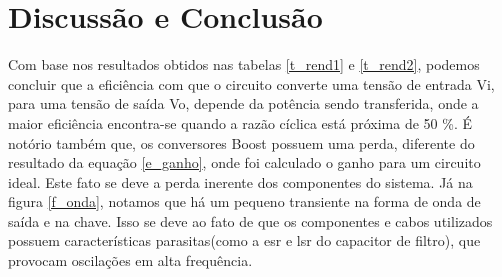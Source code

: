 \newpage
\section{Discussão e Conclusão}
Com base nos resultados obtidos nas tabelas \ref{t_rend1} e \ref{t_rend2}, podemos concluir que a eficiência com que o circuito converte uma tensão de entrada Vi, para uma tensão de saída Vo, depende da potência sendo transferida, onde a maior eficiência encontra-se quando a razão cíclica está próxima de 50 \%. É notório também que, os conversores Boost possuem uma perda, diferente do resultado da equação \ref{e_ganho}, onde foi calculado o ganho para um circuito ideal. Este fato se deve a perda inerente dos componentes do sistema.
Já na figura \ref{f_onda}, notamos que há um pequeno transiente na forma de onda de saída e na chave. Isso se deve ao fato de que os componentes e cabos utilizados possuem características parasitas(como a esr e lsr do capacitor de filtro), que provocam oscilações em alta frequência.